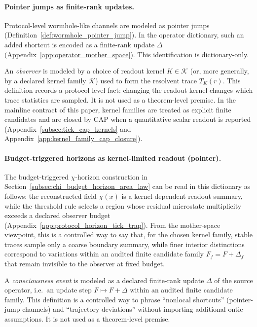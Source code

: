\paragraph{Pointer jumps as finite-rank updates.}
\InterfaceTag Protocol-level wormhole-like channels are modeled as pointer jumps (Definition~\ref{def:wormhole_pointer_jump}).
In the operator dictionary, such an added shortcut is encoded as a finite-rank update $\Delta$ (Appendix~\ref{app:operator_mother_space}).
This identification is dictionary-only.

\begin{definition}
\label{def:observer_kernel_dictionary}
\InterfaceTag An \emph{observer} is modeled by a choice of readout kernel $K\in\mathcal{K}$ (or, more generally, by a declared kernel family $\mathcal{K}$) used to form the resolvent trace $T_K(r)$.
\AuditTag This definition records a protocol-level fact: changing the readout kernel changes which trace statistics are sampled.
It is not used as a theorem-level premise.
\AuditTag In the mainline contract of this paper, kernel families are treated as explicit finite candidates and are closed by CAP when a quantitative scalar readout is reported (Appendix~\ref{subsec:tick_cap_kernels} and Appendix~\ref{app:kernel_family_cap_closure}).
\end{definition}

\paragraph{Budget-triggered horizons as kernel-limited readout (pointer).}
\InterfaceTag The budget-triggered $\chi$-horizon construction in Section~\ref{subsec:chi_budget_horizon_area_law} can be read in this dictionary as follows:
the reconstructed field $\chi(x)$ is a kernel-dependent readout summary, while the threshold rule selects a region whose residual microstate multiplicity exceeds a declared observer budget (Appendix~\ref{app:protocol_horizon_tick_trap}).
From the mother-space viewpoint, this is a controlled way to say that, for the chosen kernel family, stable traces sample only a coarse boundary summary, while finer interior distinctions correspond to variations within an audited finite candidate family $F_f=F+\Delta_f$ that remain invisible to the observer at fixed budget.

\begin{definition}
\label{def:consciousness_finite_rank_update_dictionary}
\InterfaceTag A \emph{consciousness event} is modeled as a declared finite-rank update $\Delta$ of the source operator, i.e.\ an update step $F\mapsto F+\Delta$ within an audited finite candidate family.
\AuditTag This definition is a controlled way to phrase ``nonlocal shortcuts'' (pointer-jump channels) and ``trajectory deviations'' without importing additional ontic assumptions.
It is not used as a theorem-level premise.
\end{definition}

